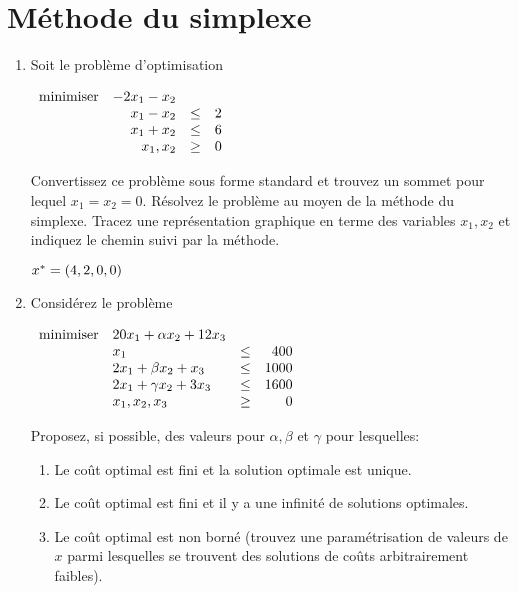 \section{Méthode du simplexe}

\begin{enumerate}

  \item Soit le problème d'optimisation

    $
    \begin{array}{lrcr}
      \mbox{minimiser} & -2x_1 - x_2 \\
      & x_1 - x_2 & \leq & 2\\
      & x_1 +  x_2 & \leq & 6\\
      & x_1, x_2 & \geq & 0
    \end{array}
    $

    Convertissez ce problème sous forme standard et trouvez un sommet pour lequel $x_1 =x_2=0$. Résolvez le problème au moyen de la méthode
    du simplexe. Tracez une représentation graphique en terme des variables $x_1, x_2$ et indiquez le chemin suivi par la méthode.

    \begin{solution}
      $x^* = (4,2,0,0)$
    \end{solution}

  \item Considérez le problème



    $
    \begin{array}{llcr}
      \mbox{minimiser} & 20 x_1+\alpha x_2+12 x_3\\
      & x_1  & \leq & 400\\
      &2x_1+\beta x_2+x_3 & \leq & 1000\\
      &2x_1+\gamma x_2+ 3x_3 & \leq & 1600\\
      & x_1, x_2, x_3 & \geq & 0
    \end{array}
    $

    Proposez, si possible, des valeurs pour $\alpha, \beta$ et $\gamma$ pour lesquelles:

    \begin{enumerate}

      \item Le coût optimal est fini et la solution optimale est unique.

      \item Le coût optimal est fini et il y a une infinité de solutions optimales.

      \item Le coût optimal est non borné (trouvez une paramétrisation de valeurs de $x$ parmi lesquelles se trouvent des solutions de coûts
        arbitrairement faibles).


\end{enumerate}
\end{enumerate}
